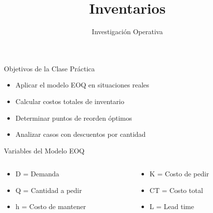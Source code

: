 \documentclass{beamer}
\title{\Huge\textbf{Inventarios}}
\author{Investigación Operativa}
\date{}
\begin{document}
\begin{frame}
    \titlepage
\end{frame}

\begin{frame}{Objetivos de la Clase Práctica}
    \begin{itemize}
        \item<1-> Aplicar el modelo EOQ en situaciones reales
        \item<2-> Calcular costos totales de inventario
        \item<3-> Determinar puntos de reorden óptimos
        \item<4-> Analizar casos con descuentos por cantidad
    \end{itemize}
\end{frame}

\begin{frame}{Variables del Modelo EOQ}
    \begin{columns}[T]
        \begin{column}{0.5\textwidth}
            \begin{itemize}
                \item \textcolor{primary}{D} = Demanda
                \item \textcolor{primary}{Q} = Cantidad a pedir
                \item \textcolor{primary}{h} = Costo de mantener
            \end{itemize}
        \end{column}
        \begin{column}{0.5\textwidth}
            \begin{itemize}
                \item \textcolor{primary}{K} = Costo de pedir
                \item \textcolor{primary}{CT} = Costo total
                \item \textcolor{primary}{L} = Lead time
            \end{itemize}
        \end{column}
    \end{columns}
\end{frame}
\end{document}
